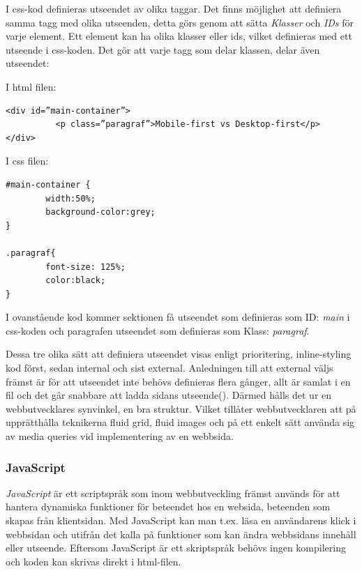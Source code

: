 \documentclass[11pt]{article}
\begin{document}
I css-kod definieras utseendet av olika taggar. Det finns möjlighet att definiera samma tagg med olika utseenden, detta görs genom att sätta \textit{Klasser} och \textit{IDs} för varje element. Ett element kan ha olika klasser eller ids, vilket definieras med ett utseende i css-koden. Det gör att varje tagg som delar klassen, delar även utseendet:

\vspace{0.3cm}
I html filen:

\begin{verbatim}
<div id=”main-container”>
          <p class=”paragraf”>Mobile-first vs Desktop-first</p>
</div>
\end{verbatim}
\vspace{0.5cm}
I css filen:

\begin{verbatim}
#main-container {
        width:50%;
        background-color:grey;
}

.paragraf{
        font-size: 125%;
        color:black;
}
\end{verbatim}
\vspace{0.5cm}

I ovanstående kod kommer sektionen få utseendet som definieras som ID: \textit{main} i css-koden och paragrafen utseendet som definieras som Klass: \textit{paragraf}.


Dessa tre olika sätt att definiera utseendet visas enligt prioritering, inline-styling kod först, sedan internal och sist external. Anledningen till att external väljs främst är för att utseendet inte behövs definieras flera gånger, allt är samlat i en fil och det går snabbare att ladda sidans utseende(\cite{css}). Därmed hålls det ur en webbutvecklares synvinkel, en bra struktur. Vilket tillåter webbutvecklaren att på upprätthålla teknikerna fluid grid, fluid images och på ett enkelt sätt använda sig av media queries vid implementering av en webbsida.

\subsubsection{JavaScript}
\textit{JavaScript} är ett scriptspråk som inom webbutveckling främst används för att hantera dynamiska funktioner för beteendet hos en websida, beteenden som skapas från klientsidan. Med JavaScript kan man t.ex. läsa en användarens klick i webbsidan och utifrån det kalla på funktioner som kan ändra webbsidans innehåll eller utseende. Eftersom JavaScript är ett skriptspråk behövs ingen kompilering och koden kan skrivas direkt i html-filen.
\end{document}
